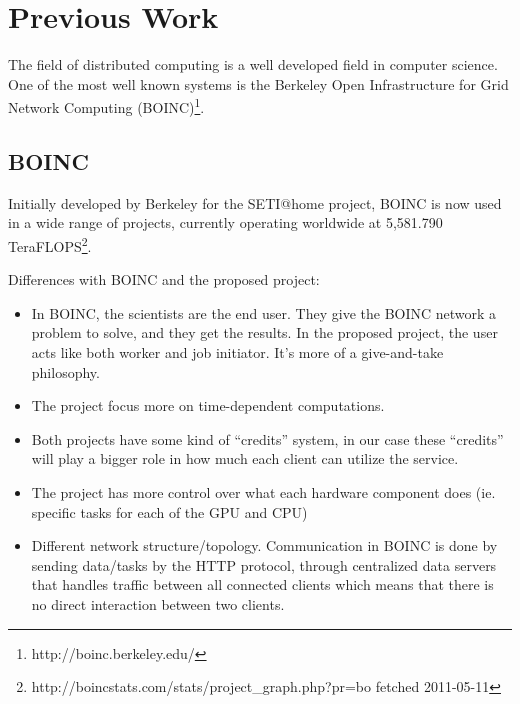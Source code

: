 \chapter{Previous Work}
The field of distributed computing is a well developed field in computer
science. One of the most well known systems is the Berkeley Open Infrastructure
for Grid Network Computing (BOINC)\footnote{http://boinc.berkeley.edu/}.
	



\section{BOINC}
Initially developed by Berkeley for the SETI@home project, BOINC is now used in
a wide range of projects, currently operating worldwide at 5,581.790 
TeraFLOPS\footnote{http://boincstats.com/stats/project\_graph.php?pr=bo 
fetched 2011-05-11}.

Differences with BOINC and the proposed project:
\begin{itemize}
	\item In BOINC, the scientists are the end user. They give the BOINC network
		a problem to solve, and they get the results. In the proposed project, 
		the user acts like both worker and job initiator. It’s more of a 
		give-and-take philosophy.
	\item The project focus more on time-dependent computations.
	\item Both projects have some kind of “credits” system, in our case these
		“credits” will play a bigger role in how much each client can utilize
		the service.
	\item The project has more control over what each hardware component does
		(ie. specific tasks for each of the GPU and CPU)
	\item Different network structure/topology. Communication in BOINC is done
		by sending data/tasks by the HTTP protocol, through centralized data
		servers that handles traffic between all connected clients which means 
		that there is no direct interaction between two clients. 
\end{itemize}

